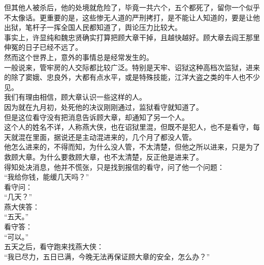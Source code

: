 \begin{multicols}{\theparacolNo}
但其他人被杀后，他的处境就危险了，毕竟一共六个，五个都死了，留你一个似乎不太像话。更重要的是，这些惨无人道的严刑拷打，是不能让人知道的，要是让他出狱，笔杆子一挥全国人民都知道了，舆论压力比较大。\\

事实上，许显纯和魏忠贤确实打算把顾大章干掉，且越快越好。顾大章去阎王那里伸冤的日子已经不远了。\\

然而这个世界上，意外的事情总是经常发生的。\\

一般说来，管牢房的人交际都比较广泛。特别是天牢、诏狱这种高档次监狱，进来的除了窦娥、忠良外，大都有点水平，或是特殊技能，江洋大盗之类的牛人也不少见。\\

我们有理由相信，顾大章认识一些这样的人。\\

因为就在九月初，处死他的决议刚刚通过，监狱看守就知道了。\\

但是这位看守没有把消息告诉顾大章，却通知了另一个人。\\

这个人的姓名不详，人称燕大侠，也在诏狱里混，但既不是犯人，也不是看守，每天就混在里面，据说还是主动混进来的，几个月了都没人管。\\

他怎么进来的，不得而知，为什么没人管，不太清楚，但他之所以进来，只是为了救顾大章。为什么要救顾大章，也不太清楚，反正他是进来了。\\

得知处决消息，他并不慌张，只是找到报信的看守，问了他一个问题：\\

“我给你钱，能缓几天吗？”\\

看守问：\\

“几天？”\\

燕大侠答：\\

“五天。”\\

看守答：\\

“可以。”\\

五天之后，看守跑来找燕大侠：\\

“我已尽力，五日已满，今晚无法再保证顾大章的安全，怎么办？”\\


\end{multicols}
